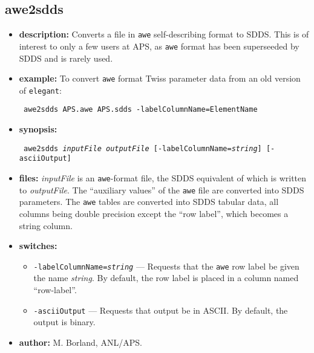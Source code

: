 \begin{latexonly}
\newpage
\end{latexonly}
\subsection{awe2sdds}
\label{awe2sdds}

\begin{itemize}
\item {\bf description:} 
Converts a file in \verb|awe| self-describing format to SDDS.  This is of interest to
only a few users at APS, as \verb|awe| format has been superseeded by SDDS and is rarely used.
\item {\bf example:} 
To convert {\tt awe} format Twiss parameter data from an old version of \verb|elegant|:
\begin{flushleft}{\tt 
awe2sdds APS.awe APS.sdds -labelColumnName=ElementName
}\end{flushleft}
\item {\bf synopsis:}
\begin{flushleft}{\tt 
awe2sdds {\em inputFile} {\em outputFile} [-labelColumnName={\em string}] [-asciiOutput]
}\end{flushleft}
\item {\bf files:} 
{\em inputFile} is an {\tt awe}-format file, the SDDS equivalent of which is written to {\em outputFile}.
The ``auxiliary values'' of the {\tt awe} file are converted into SDDS parameters.  The {\tt awe} tables
are converted into SDDS tabular data, all columns being double precision except the ``row label'', which
becomes a string column.
\item {\bf switches:}
    \begin{itemize}
    \item {\tt -labelColumnName={\em string}} --- Requests that the {\tt awe} row label be given the name {\em string}.
        By default, the row label is placed in a column named ``row-label''.
    \item \verb|-asciiOutput| --- Requests that output be in ASCII.  By default, the output is binary.
    \end{itemize}
\item {\bf author:} M. Borland, ANL/APS.
\end{itemize}

